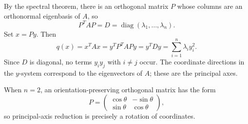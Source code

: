 \begin{solution}
By the spectral theorem, there is an orthogonal matrix \(P\) whose columns are an orthonormal
eigenbasis of \(A\), so
\[
P^TAP=D=\operatorname{diag}(\lambda_1,\dots,\lambda_n).
\]
Set \(x=Py\). Then
\[
q(x)=x^TAx
=y^TP^TAPy
=y^TDy
=\sum_{i=1}^{n}\lambda_i y_i^2.
\]
Since \(D\) is diagonal, no terms \(y_iy_j\) with \(i\ne j\) occur. The coordinate directions in
the \(y\)-system correspond to the eigenvectors of \(A\); these are the principal axes.

When \(n=2\), an orientation-preserving orthogonal matrix has the form
\[
P=
\begin{pmatrix}
\cos\theta&-\sin\theta\\
\sin\theta&\cos\theta
\end{pmatrix},
\]
so principal-axis reduction is precisely a rotation of coordinates.
\end{solution}
